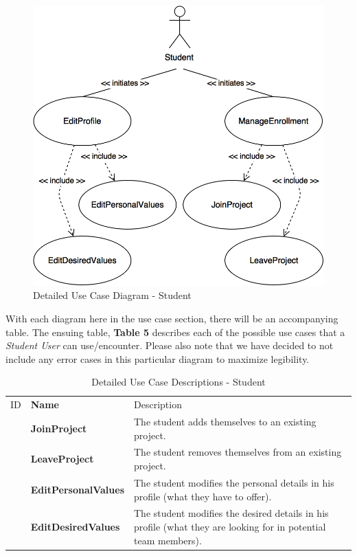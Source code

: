 \documentclass[12pt,letterpaper]{article}
\begin{document}
\begin{figure}[H]
	\centering{}
	\includegraphics[scale=0.3]{imgs/detailed-student-use-case-diagram.png}
	\caption{Detailed Use Case Diagram - Student}
\end{figure}

With each diagram here in the use case section, there will be an accompanying table. The ensuing table, {\bf Table 5} describes each of the possible use cases that a {\it Student User} can use/encounter.
Please also note that we have decided to not include any error cases in this particular diagram to maximize legibility.

\begin{table}[H]
	\caption{Detailed Use Case Descriptions - Student}
	\begin{tabu} to 
	    \tableheader{}ID & Name & Description\\
		\joinproject{} & JoinProject & The student adds themselves to an existing project.\\
		\leaveproject{} & LeaveProject & The student removes themselves from an existing project.\\
		\editpersonalvalues{} & EditPersonalValues & The student modifies the personal details in his profile (what they have to offer).\\
		\editdesiredvalues{} & EditDesiredValues & The student modifies the desired details in his profile (what they are looking for in potential team members).\\
	\end{tabu}
\end{table}
\end{document}
